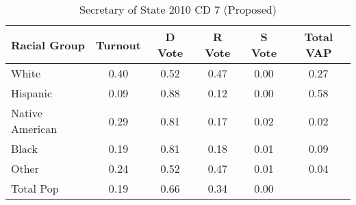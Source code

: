 \begin{table}[htb]
\begin{center}
\caption{Secretary of State 2010 CD 7 (Proposed)}
\label{sos10_vap_cd_7}
\begin{tabular}{lccccc}
  \hline
Racial Group & Turnout & D Vote & R Vote & S Vote & Total VAP \\ 
  \hline
White & 0.40 & 0.52 & 0.47 & 0.00 & 0.27 \\ 
  Hispanic & 0.09 & 0.88 & 0.12 & 0.00 & 0.58 \\ 
  Native American & 0.29 & 0.81 & 0.17 & 0.02 & 0.02 \\ 
  Black & 0.19 & 0.81 & 0.18 & 0.01 & 0.09 \\ 
  Other & 0.24 & 0.52 & 0.47 & 0.01 & 0.04 \\ 
  Total Pop & 0.19 & 0.66 & 0.34 & 0.00 &  \\ 
   \hline
\end{tabular}
\end{center}
\end{table}

